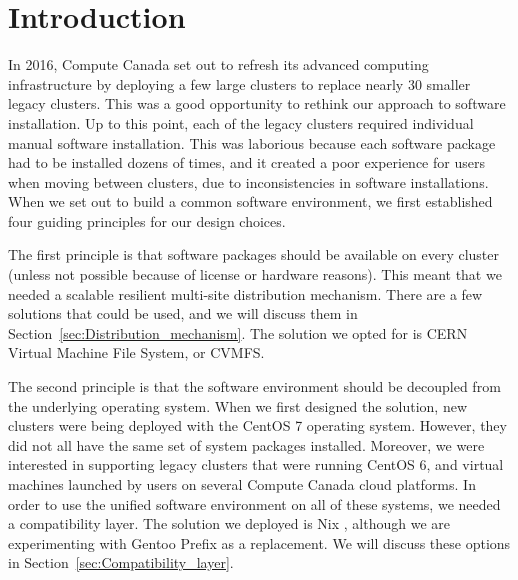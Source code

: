 \documentclass[sigconf]{acmart}
\begin{document}
%

%
\maketitle

\section{Introduction}
\label{sec:Introduction}
In 2016, Compute Canada set out to refresh its advanced computing infrastructure by deploying a few large clusters to replace nearly 30 smaller legacy clusters. This was a good opportunity to rethink our approach to software installation. Up to this point, each of the legacy clusters required individual manual software installation. This was laborious because each software package had to be installed dozens of times, and it created a poor experience for users when moving between clusters, due to inconsistencies in software installations. When we set out to build a common software environment, we first established four guiding principles for our design choices.

The first principle is that software packages should be available on every cluster (unless not possible because of license or hardware reasons). This meant that we needed a scalable resilient multi-site distribution mechanism. There are a few solutions that could be used, and we will discuss them in Section~\ref{sec:Distribution_mechanism}. The solution we opted for is CERN Virtual Machine File System, or CVMFS\cite{CVMFS}.

The second principle is that the software environment should be decoupled from the underlying operating system. When we first designed the solution, new clusters were being deployed with the CentOS 7 operating system. However, they did not all have the same set of system packages installed. Moreover, we were interested in supporting legacy clusters
that were running CentOS 6, and virtual machines launched by users on several Compute Canada cloud platforms. In order to use the unified software environment on all of these systems, we needed a compatibility layer. 
The solution we deployed is Nix \cite{Nix}, although we are experimenting with Gentoo Prefix \cite{Gentoo} as a replacement. We will discuss these options in Section~\ref{sec:Compatibility_layer}.
\end{document}
